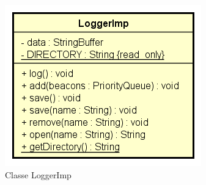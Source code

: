 \documentclass[../DefinizioneDiProdotto.tex]{subfiles}
\begin{document}
    \begin{figure}[H]
        \centering
        \includegraphics{img/LoggerImp.png}
        \caption{Classe LoggerImp}\label{fig:model::beacon::LoggerImp} 
    \end{figure}
\end{document}
